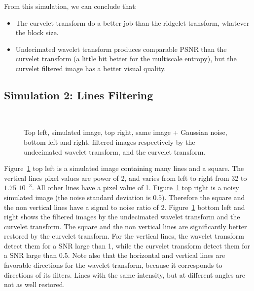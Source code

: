 \documentclass{article}
\begin{document}
From this simulation, we can conclude that:
\begin{itemize}
\item The curvelet transform do a better job than the ridgelet transform,
whatever the block size.
\item Undecimated wavelet transform produces comparable PSNR than the
curvelet transform (a little bit better for the multiscale entropy),
but the curvelet filtered image has a better visual quality.
\end{itemize}

\subsection{Simulation 2: Lines Filtering}

\begin{figure}[htb]
\centerline{
\vbox{
\hbox{
}
\hbox{
}}}
\caption{Top left, simulated image, top right, same image + Gaussian noise,
bottom left and right, filtered images respectively 
by the undecimated wavelet
transform, and the curvelet transform.}
\label{fig_cur_line}
\end{figure}
Figure~\ref{fig_cur_line} top left is a simulated image containing many lines
and a square. The vertical lines pixel values are power of 2, and
varies from left to right from 32 to $1.75$ $10^{-3}$. All other lines have 
a pixel value of 1. Figure~\ref{fig_cur_line} top right is a noisy 
simulated image (the noise standard deviation is $0.5$). Therefore the
square and the non vertical lines have a signal to noise ratio of 2.
Figure~\ref{fig_cur_line} bottom left and right shows the filtered images
by the undecimated wavelet transform and the curvelet transform.
The square and the non vertical lines are significantly better restored by
the curvelet transform. For the vertical lines, the wavelet transform detect
them for a SNR large than 1, while the curvelet transform detect them  
for a SNR large than $0.5$. Note also that  the horizontal and vertical 
lines are favorable directions for the wavelet transform, because it corresponds
to directions of its filters. Lines with the same intensity, but at different 
angles are not as well restored.
\end{document}
